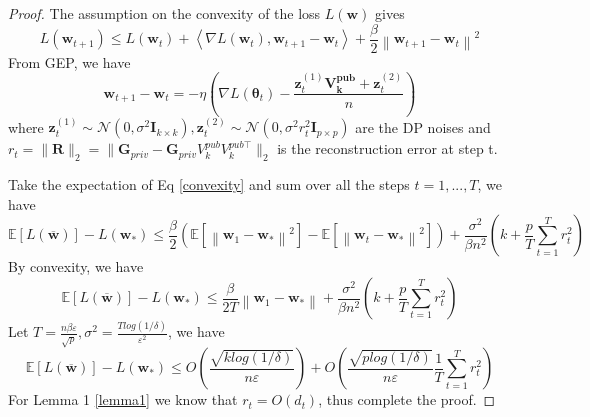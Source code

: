\documentclass[11pt]{article}
\renewcommand{\epsilon}{\varepsilon}
\begin{document}
\begin{proof}
    The assumption on the convexity of the loss $L(\mathbf{w})$ gives
    \begin{equation}
    \label{convexity}
        L\left(\boldsymbol{w}_{t+1}\right) \leq L\left(\boldsymbol{w}_t\right)+\left\langle\nabla L\left(\boldsymbol{w}_t\right), \boldsymbol{w}_{t+1}-\boldsymbol{w}_t\right\rangle+\frac{\beta}{2}\left\|\boldsymbol{w}_{t+1}-\boldsymbol{w}_t\right\|^2
    \end{equation}
    From GEP, we have
    \begin{equation}
        \boldsymbol{w}_{t+1}-\boldsymbol{w}_t=-\eta \left(\nabla L(\boldsymbol{\theta}_t)-\frac{\boldsymbol{z}_t^{(1)} \boldsymbol{V_{k}^{pub}}+\boldsymbol{z}_t^{(2)}}{n}\right)
    \end{equation}
    where $\boldsymbol{z}_t^{(1)} \sim \mathcal{N}\left(0, \sigma^2 \boldsymbol{I}_{k \times k}\right), \boldsymbol{z}_t^{(2)} \sim \mathcal{N}\left(0, \sigma^2 r_t^2 \boldsymbol{I}_{p \times p}\right)$ are the DP noises and $r_t = \|\mathbf{R}\|_2 = \|\mathbf{G}_{p r i v}-\mathbf{G}_{p r i v} V_k^{p u b} V_k^{p u b \top} \|_2$ is the reconstruction error at step t.

    Take the expectation of Eq \ref{convexity} and sum over all the steps $t = 1, ..., T$, we have
    \begin{equation}
        \mathbb{E}[L(\overline{\boldsymbol{w}})]-L\left(\boldsymbol{w}_*\right) \leq \frac{\beta}{2}\left(\mathbb{E}\left[\left\|\boldsymbol{w}_1-\boldsymbol{w}_*\right\|^2\right]-\mathbb{E}\left[\left\|\boldsymbol{w}_{t}-\boldsymbol{w}_*\right\|^2\right]\right)+\frac{\sigma^2}{\beta n^2}\left(k+\frac{p}{T} \sum_{t=1}^{T} r_t^2\right)
    \end{equation}
    By convexity, we have
    \begin{equation}
        \mathbb{E}[L(\overline{\boldsymbol{w}})]-L\left(\boldsymbol{w}_*\right) \leq \frac{\beta}{2 T}\left\|\boldsymbol{w}_1-\boldsymbol{w}_*\right\|+\frac{\sigma^2}{\beta n^2}\left(k+\frac{p}{T} \sum_{t=1}^{T} r_t^2\right)
    \end{equation}
    Let $T=\frac{n \beta \epsilon}{\sqrt{p}}, \sigma^2 = \frac{Tlog(1/\delta)}{\epsilon^2}$, we have
    \begin{equation}
        \mathbb{E}[L(\overline{\boldsymbol{\mathbf{w}}})]-L\left(\boldsymbol{\mathbf{w}}_*\right) \le O\left(\frac{\sqrt{klog(1/\delta)}}{n\epsilon}\right) + O\left(\frac{\sqrt{plog(1/\delta)}}{n\epsilon}\frac{1}{T}\sum_{t=1}^{T} r_t^2\right)
    \end{equation}
    For Lemma 1 \ref{lemma1} we know that $r_t = O(d_t)$, thus complete the proof.   
\end{proof}
\end{document}
